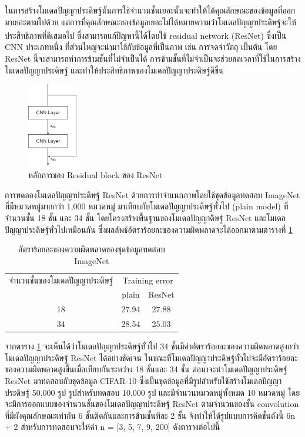ในการสร้างโมเดลปัญญาประดิษฐ์นั้นการใช้จำนวนชั้นเยอะนั้นจะทำให้ได้คุณลักษณะของข้อมูลที่ออกมาเยอะตามไปด้วย 
แต่การที่คุณลักษณะของข้อมูลเยอะไม่ได้หมายความว่าโมเดลปัญญาประดิษฐ์จะให้ประสิทธิภาพที่ดีเสมอไป ซึ่งสามารถแก้ปัญหานี้ได้โดยใช้ residual network (ResNet)\textsuperscript{\cite{he2016deep}}
ซึ่งเป็น CNN ประเภทหนึ่ง ที่ส่วนใหญ่จะนำมาใช้กับข้อมูลที่เป็นภาพ เช่น การจดจำวัตถุ เป็นต้น โดย ResNet นี้จะสามารถทำการข้ามชั้นที่ไม่จำเป็นได้ 
การข้ามชั้นที่ไม่จำเป็นจะช่วยลดเวลาที่ใช้ในการสร้างโมเดลปัญญาประดิษฐ์ และทำให้ประสิทธิภาพของโมเดลปัญญาประดิษฐ์ดีขึ้น

\begin{figure}[!ht]
	\centering
	\includegraphics[width=0.2\textwidth]{chapter2/images/example_resnet.png}
		\caption{หลักการของ Residual block ของ ResNet}
    	\label{fig:ResNet}
\end{figure}

การทดลองโมเดลปัญญาประดิษฐ์ ResNet ด้วยการทำจำแนกภาพโดยใช้ชุดข้อมูลทดสอบ ImageNet ที่มีหมวดหมู่มากกว่า 1,000 หมวดหมู่
มาเทียบกับโมเดลปัญญาประดิษฐ์ทั่วไป (plain model) ที่จำนวนชั้น 18 ชั้น และ 34 ชั้น โดยโครงสร้างพื้นฐานของโมเดลปัญญาดิษฐ์ ResNet และโมเดลปัญญาประดิษฐ์ทั่วไปเหมือนกัน 
ซึ่งผลลัพธ์อัตราร้อยละของความผิดพลาดจะได้ออกมาตามตารางที่ \ref{tab: Top-1 error of ImageNet} 

\begin{table}[!ht]
	\centering
	\begin{tabular}{|c|c|c|}
		\hline
		{จำนวนชั้นของโมเดลปัญญาประดิษฐ์}&\multicolumn{2}{c|}{Training error}\\
		\cline{2-3}
		{}							& plain						& ResNet			\\
		\hline
		18							& 27.94						& 27.88				\\
		34							& 28.54						& 25.03				\\
		\hline
	\end{tabular}
	\caption{อัตราร้อยละของความผิดพลาดของชุดข้อมูลทดสอบ ImageNet}
	\label{tab: Top-1 error of ImageNet}
\end{table}

จากตาราง \ref{tab: Top-1 error of ImageNet} จะเห็นได้ว่าโมเดลปัญญาประดิษฐ์ทั่วไป 34 ชั้นมีค่าอัตราร้อยละของความผิดพลาดสูงกว่าโมเดลปัญญาประดิษฐ์ ResNet 
ได้อย่างชัดเจน ในขณะที่โมเดลปัญญาประดิษฐ์ทั่วไปจะมีอัตราร้อยละของความผิดพลาดสูงขึ้นเมื่อเทียบกันระหว่าง 18 ชั้นและ 34 ชั้น
\clearpage
ต่อมาจะนำโมเดลปัญญาประดิษฐ์ ResNet มาทดสอบกับชุดข้อมูล CIFAR-10 ซึ่งเป็นชุดข้อมูลที่มีรูปสำหรับใช้สร้างโมเดลปัญญาประดิษฐ์ 50,000 รูป รูปสำหรับทดสอบ 10,000 รูป 
และมีจำนวนหมวดหมู่ทั้งหมด 10 หมวดหมู่ โดยจะมีการออกแบบของจำนวนชั้นของโมเดลปัญญาประดิษฐ์ ResNet ตามจำนวนของชั้น convolution 
ที่มีผังคุณลักษณะเท่ากัน 6 ชั้นติดกันและการข้ามชั้นทีละ 2 ชั้น จึงทำให้ได้รูปแบบการคิดชั้นดังนี้ 6n + 2 สำหรับการทดสอบจะให้ค่า n = [3, 5, 7, 9, 200] ดังตารางต่อไปนี้

